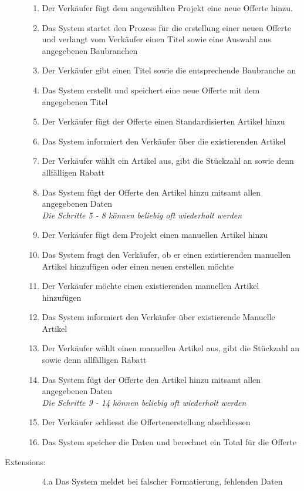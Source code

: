 \documentclass[journal]{combine}
\begin{document}
\begin{description}
\begin{enumerate}
			\item Der Verkäufer fügt dem angewählten Projekt eine neue Offerte hinzu.
			\item Das System startet den Prozess für die erstellung einer neuen Offerte und
			verlangt vom Verkäufer einen Titel sowie eine Auswahl aus angegebenen Baubranchen
			\item Der Verkäufer gibt einen Titel sowie die entsprechende Baubranche an
			\item Das System erstellt und speichert eine neue Offerte mit dem 
				angegebenen Titel
			\item Der Verkäufer fügt der Offerte einen Standardisierten Artikel hinzu
			\item Das System informiert den Verkäufer über die existierenden Artikel
			\item Der Verkäufer wählt ein Artikel aus, gibt die Stückzahl an sowie 
			denn allfälligen Rabatt
			\item Das System fügt der Offerte den Artikel hinzu mitsamt allen angegebenen Daten\\
			\emph{Die Schritte 5 - 8 können beliebig oft wiederholt werden}
			\item Der Verkäufer fügt dem Projekt einen manuellen Artikel hinzu
			\item Das System fragt den Verkäufer, ob er einen existierenden manuellen Artikel hinzufügen 
			oder einen neuen erstellen möchte
			\item Der Verkäufer möchte einen existierenden manuellen Artikel hinzufügen
			\item Das System informiert den Verkäufer über existierende Manuelle Artikel
			\item Der Verkäufer wählt einen manuellen Artikel aus, gibt die Stückzahl an sowie 
			denn allfälligen Rabatt
			\item Das System fügt der Offerte den Artikel hinzu mitsamt allen angegebenen Daten\\
			\emph{Die Schritte 9 - 14 können beliebig oft wiederholt werden}
			\item Der Verkäufer schliesst die Offertenerstellung abschliessen
			\item Das System speicher die Daten und berechnet ein Total für die Offerte
		\end{enumerate}
		\newpage
		\item[Extensions:] \hfill  
		\begin{enumerate}
			\item [4.a] Das System meldet bei falscher Formatierung, fehlenden Daten

\end{enumerate}
\end{description}
\end{document}
